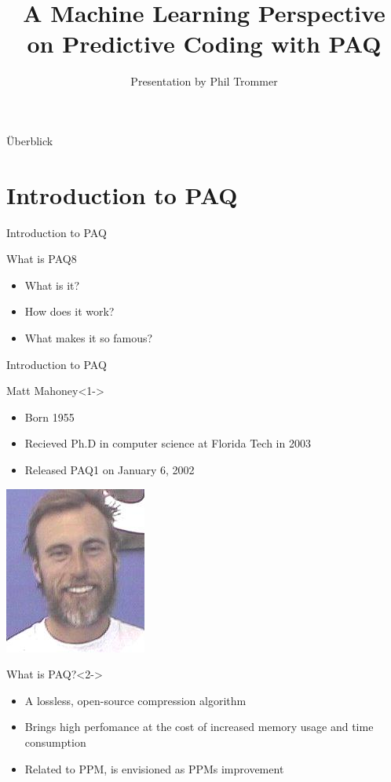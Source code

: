 \documentclass[11pt,usenames,dvipsnames]{beamer}
\author{Presentation by Phil Trommer}
\title{A Machine Learning Perspective on Predictive Coding with PAQ}
\begin{document}
\begin{frame}
\titlepage
\end{frame}

\begin{frame}{Überblick}
\tableofcontents
\end{frame}


\section{Introduction to PAQ}


\begin{frame}{Introduction to PAQ}
	\begin{block}{What is PAQ8}
			\begin{itemize}
				\item What is it?
				\item How does it work?
				\item What makes it so famous?
			\end{itemize}
	\end{block}
\end{frame}

\begin{frame}{Introduction to PAQ}
	\begin{exampleblock}{Matt Mahoney}<1->
	\begin{minipage}[b]{0.70\linewidth}
		\begin{itemize}
			\item Born 1955
			\item Recieved Ph.D in computer science at Florida Tech in 2003
			\item Released PAQ1 on January 6, 2002
		\end{itemize}
	\hfill
	\end{minipage}
	\begin{minipage}[b]{0.28\linewidth}
		\includegraphics[scale=1.5]{files/matt.jpg}
	\end{minipage}
	\end{exampleblock}
	
	\begin{alertblock}{What is PAQ?}<2->
		\begin{itemize}
			\item A lossless, open-source compression algorithm
			\item Brings high perfomance at the cost of increased memory usage and time consumption
			\item Related to PPM, is envisioned as PPMs improvement
		\end{itemize}
	\end{alertblock}
\end{frame}
\end{document}
